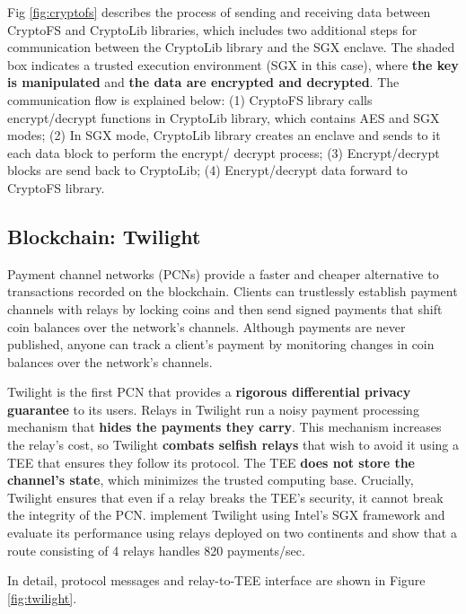 \documentclass[lang=en]{sjtuarticle}
\begin{document}
Fig \ref{fig:cryptofs} describes the process of sending and receiving data
between CryptoFS and CryptoLib libraries, which includes
two additional steps for communication between the CryptoLib
library and the SGX enclave. The shaded box indicates
a trusted execution environment (SGX in this case), where \textbf{the
key is manipulated} and \textbf{the data are encrypted and decrypted}.
The communication flow is explained below:
(1) CryptoFS library calls encrypt/decrypt functions in
CryptoLib library, which contains AES and SGX modes;
(2) In SGX mode, CryptoLib library creates an enclave
and sends to it each data block to perform the encrypt/
decrypt process;
(3) Encrypt/decrypt blocks are send back to CryptoLib;
(4) Encrypt/decrypt data forward to CryptoFS library.

\subsection{Blockchain: Twilight}

Payment channel networks (PCNs) provide a faster and
cheaper alternative to transactions recorded on the blockchain.
Clients can trustlessly establish payment channels with relays
by locking coins and then send signed payments that
shift coin balances over the network's channels. Although
payments are never published, anyone can track a client's
payment by monitoring changes in coin balances over the
network’s channels.

Twilight \cite{twilight} is the first
PCN that provides a \textbf{rigorous differential privacy guarantee} to
its users. Relays in Twilight run a noisy payment processing
mechanism that \textbf{hides the payments they carry}. This mechanism
increases the relay's cost, so Twilight \textbf{combats selfish
relays} that wish to avoid it using a TEE that ensures they follow its protocol. The TEE
\textbf{does not store the channel's state}, which minimizes the trusted
computing base. Crucially, Twilight ensures that even if a relay
breaks the TEE's security, it cannot break the integrity of
the PCN.  implement Twilight
using Intel's SGX framework and evaluate its performance
using relays deployed on two continents and show that a route
consisting of 4 relays handles 820 payments/sec.

In detail, protocol messages and relay-to-TEE interface are shown in Figure \ref{fig:twilight}.
\end{document}
